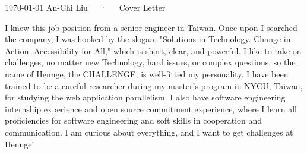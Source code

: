\documentclass[11pt, a4paper]{awesome-cv}
\begin{document}
\makecvheader[L]

\makecvfooter
  {\today}
  {An-Chi Liu~~~·~~~Cover Letter}
  {}

\makelettertitle

\begin{cvletter}



I knew this job position from a senior engineer in Taiwan. Once upon I searched
the company, I was hooked by the slogan, "Solutions in Technology. Change in Action. Accessibility for All,"
which is short, clear, and powerful. I like to take on challenges, no matter new Technology,
hard issues, or complex questions, so the name of Hennge, the CHALLENGE, is
well-fitted my personality. I have been trained to be a careful researcher during
my master's program in NYCU, Taiwan, for studying the web application parallelism.
I also have software engineering internship experience and open source commitment experience,
where I learn all proficiencies for software engineering and soft skills in cooperation and communication.
I am curious about everything, and I want to get challenges at Hennge!

\end{cvletter}


\makeletterclosing
\end{document}
